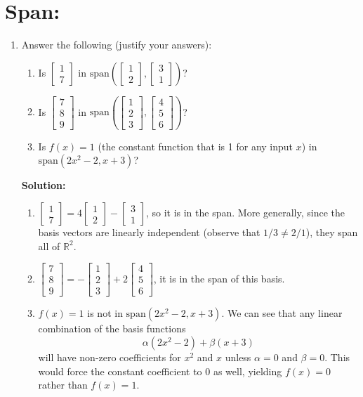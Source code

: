 \documentclass[]{article}
\newcommand{\R}{\mathbb{R}}
\newcommand{\bbm}{\begin{bmatrix}}
\newcommand{\ebm}{\end{bmatrix}}
\newcommand{\vspan}{\mathrm{span}}
\newcommand{\solution}{\vskip 0.5cm \textbf{\large Solution:} \\}
\begin{document}
    \section*{Span:}
    \begin{enumerate}[resume]
	\item Answer the following (justify your answers):
	  \begin{enumerate}
	  \item Is $\bbm 1\\7\ebm$ in $\vspan \left(\bbm 1\\2 \ebm,\bbm 3\\1 \ebm \right)$?
	  \item Is $\bbm 7\\8\\9\ebm$ in $\vspan\left(\bbm 1\\2\\3 \ebm,\bbm 4\\5\\6 \ebm \right)$?
	  \item Is $f(x)=1$ (the constant function that is 1 for any input $x$) in $\vspan(2x^2-2, x+3)$?
	  \end{enumerate}
      
	  \solution
	  \begin{enumerate}
	  \item
        $\bbm 1\\7\ebm = 4 \bbm 1\\2 \ebm - \bbm 3\\1 \ebm$, so it is in
        the span. More generally, since the basis vectors are linearly
        independent (observe that $1/3 \neq 2/1$), they span all of $\R^2$.
        
	  \item $\bbm 7\\8\\9\ebm = -\bbm 1\\2\\3 \ebm + 2 \bbm 4\\5\\6
        \ebm$, it is in the span of this basis.

	  \item $f(x) = 1$ is not in $\vspan(2x^2-2, x+3)$. We can see that
        any linear combination of the basis functions
        \[
        \alpha(2x^2 - 2) + \beta(x + 3)
        \]
        will have non-zero coefficients for $x^2$ and $x$ unless $\alpha
        = 0$ and $\beta = 0$. This would force the constant coefficient
        to 0 as well, yielding $f(x) = 0$ rather than $f(x) = 1$.
	  \end{enumerate}
    \end{enumerate}
\end{document}
